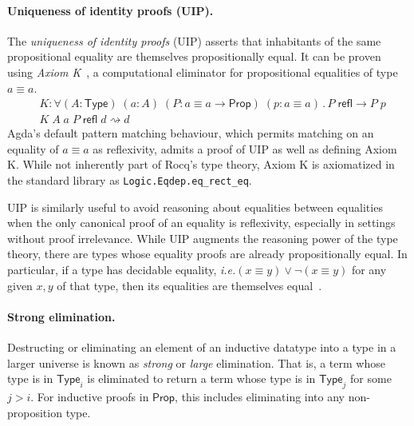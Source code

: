 \documentclass{article}
\makeatletter
\newcommand{\ie}{\textit{i.e.}\@\xspace}
\newcommand{\kw}[1]{\mathsf{#1}}
\newcommand{\code}[1]{\texttt{#1}}
\makeatother
\begin{document}
\paragraph{Uniqueness of identity proofs (UIP).}
The \emph{uniqueness of identity proofs} (UIP)
asserts that inhabitants of the same propositional equality
are themselves propositionally equal.
It can be proven using \emph{Axiom K}~\citep{axiomk},
a computational eliminator for propositional equalities of type $a \equiv a$.
%
\begin{align*}
  &K : \forall (A : \kw{Type}) \; (a : A) \; (P : a \equiv a \to \kw{Prop}) \; (p : a \equiv a) \mathpunct{.}
    P \; \kw{refl} \to P \; p \\
  &K \; A \; a \; P \; \kw{refl} \; d \rightsquigarrow d
\end{align*}
%
Agda's default pattern matching behaviour,
which permits matching on an equality of $a \equiv a$ as reflexivity,
admits a proof of UIP as well as defining Axiom K.
While not inherently part of Rocq's type theory,
Axiom K is axiomatized in the standard library as \code{Logic.Eqdep.eq\_rect\_eq}.

UIP is similarly useful to avoid reasoning about equalities between equalities
when the only canonical proof of an equality is reflexivity,
especially in settings without proof irrelevance.
While UIP augments the reasoning power of the type theory,
there are types whose equality proofs are already propositionally equal.
In particular, if a type has decidable equality,
\ie $(x \equiv y) \vee \neg (x \equiv y)$ for any given $x, y$ of that type,
then its equalities are themselves equal~\citep{hedberg}.

\paragraph{Strong elimination.}
Destructing or eliminating an element of an inductive datatype
into a type in a larger universe is known as \emph{strong} or \emph{large} elimination.
That is, a term whose type is in $\kw{Type}_i$
is eliminated to return a term whose type is in $\kw{Type}_j$
for some $j > i$.
For inductive proofs in $\kw{Prop}$,
this includes eliminating into any non-proposition type.
\end{document}
